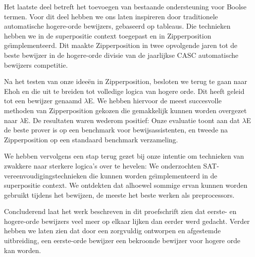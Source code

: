 {Het laatste deel betreft het toevoegen van bestaande ondersteuning voor Boolse termen. Voor dit deel hebben we ons laten inspireren door traditionele automatische hogere-orde bewijzers, gebaseerd op tableaus. Die technieken hebben we in de superpositie context toegepast en in Zipperposition ge\"{\i}mplementeerd. Dit maakte Zipperposition in twee opvolgende jaren tot de beste bewijzer in de hogere-orde divisie van de jaarlijkse CASC automatische bewijzers competitie.

Na het testen van onze idee\"en in Zipperposition, besloten we terug te gaan naar Ehoh en die uit te breiden tot volledige logica van hogere orde. Dit heeft geleid tot een bewijzer genaamd $\lambda$E. We hebben hiervoor de meest succesvolle methoden van Zipperposition gekozen die gemakkelijk kunnen worden overgezet naar $\lambda$E. De resultaten waren wederom positief: Onze evaluatie toont aan dat $\lambda$E de beste prover is op een benchmark voor bewijsassistenten, en tweede na Zipperposition op een standaard benchmark verzameling.

We hebben vervolgens een stap terug gezet bij onze intentie om technieken van zwakkere naar sterkere logica's over te hevelen: We onderzochten SAT-vereenvoudi\-gingstechnie\-ken die kunnen worden ge\"{\i}mplementeerd in de superpositie context. We ontdekten dat alhoewel sommige ervan kunnen worden gebruikt tijdens het bewijzen, de meeste het beste werken als preprocessors.

Concluderend laat het werk beschreven in dit proefschrift zien dat eerste- en hogere-orde bewijzers veel meer op elkaar lijken dan eerder werd gedacht. Verder hebben we laten zien dat door een zorgvuldig ontworpen en afgestemde uitbreiding, een eerste-orde bewijzer een bekroonde bewijzer voor hogere orde kan worden.
}



